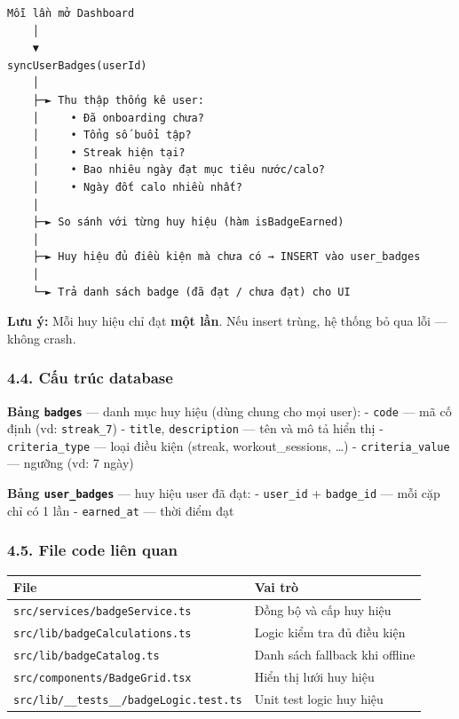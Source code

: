 \documentclass[12pt,a4paper]{article}
\newcounter{none}
\begin{document}
\begin{verbatim}
Mỗi lần mở Dashboard
    │
    ▼
syncUserBadges(userId)
    │
    ├─► Thu thập thống kê user:
    │     • Đã onboarding chưa?
    │     • Tổng số buổi tập?
    │     • Streak hiện tại?
    │     • Bao nhiêu ngày đạt mục tiêu nước/calo?
    │     • Ngày đốt calo nhiều nhất?
    │
    ├─► So sánh với từng huy hiệu (hàm isBadgeEarned)
    │
    ├─► Huy hiệu đủ điều kiện mà chưa có → INSERT vào user_badges
    │
    └─► Trả danh sách badge (đã đạt / chưa đạt) cho UI
\end{verbatim}

\textbf{Lưu ý:} Mỗi huy hiệu chỉ đạt \textbf{một lần}. Nếu insert trùng,
hệ thống bỏ qua lỗi --- không crash.

\subsubsection{4.4. Cấu trúc database}\label{cux1ea5u-truxfac-database}

\textbf{Bảng \texttt{badges}} --- danh mục huy hiệu (dùng chung cho mọi
user): - \texttt{code} --- mã cố định (vd: \texttt{streak\_7}) -
\texttt{title}, \texttt{description} --- tên và mô tả hiển thị -
\texttt{criteria\_type} --- loại điều kiện (streak, workout\_sessions,
\ldots) - \texttt{criteria\_value} --- ngưỡng (vd: 7 ngày)

\textbf{Bảng \texttt{user\_badges}} --- huy hiệu user đã đạt: -
\texttt{user\_id} + \texttt{badge\_id} --- mỗi cặp chỉ có 1 lần -
\texttt{earned\_at} --- thời điểm đạt

\subsubsection{4.5. File code liên quan}\label{file-code-liuxean-quan-1}

{\def\LTcaptype{none} %
\begin{longtable}[]{@{}ll@{}}
\toprule\noalign{}
File & Vai trò \\
\midrule\noalign{}
\endhead
\bottomrule\noalign{}
\endlastfoot
\texttt{src/services/badgeService.ts} & Đồng bộ và cấp huy hiệu \\
\texttt{src/lib/badgeCalculations.ts} & Logic kiểm tra đủ điều kiện \\
\texttt{src/lib/badgeCatalog.ts} & Danh sách fallback khi offline \\
\texttt{src/components/BadgeGrid.tsx} & Hiển thị lưới huy hiệu \\
\texttt{src/lib/\_\_tests\_\_/badgeLogic.test.ts} & Unit test logic huy
hiệu \\
\end{longtable}
}
\end{document}
